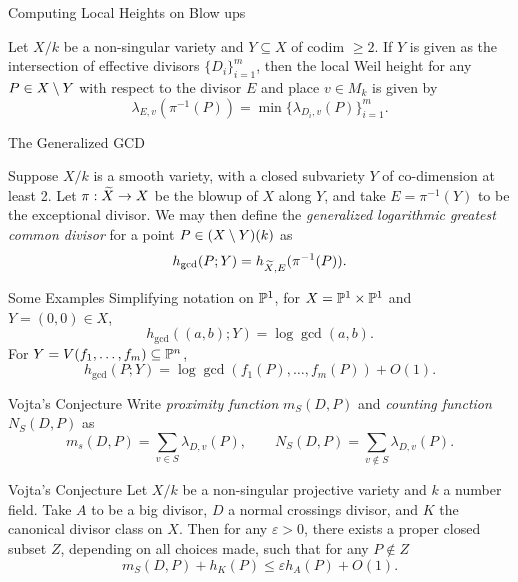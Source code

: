 \documentclass{beamer}
\begin{document}
\begin{frame}{Computing Local Heights on Blow ups}
    \begin{lemma}
        Let $X/k$ be a non-singular variety and $Y \subseteq X$ of codim $\geq 2$.
        If $Y$ is given as the intersection of effective divisors $\{D_i\}_{i = 1}^m$,
        then the local Weil height for any $P \in X \setminus Y$ with respect to the divisor $E$ and place $v \in M_k$ is given by
        \[
            \lambda_{E, v}(\pi^{-1}(P)) = \min\{\lambda_{D_i, v}(P)\}_{i = 1}^m.
        \]
    \end{lemma}
\end{frame}

\begin{frame}{The Generalized GCD}
    \begin{definition}
        Suppose $X/k$ is a smooth variety, with a closed subvariety $Y$ of co-dimension at least 2.
        Let $\pi : \widetilde X \to X$ be the blowup of $X$ along $Y$, 
        and take $E = \pi^{-1}(Y)$ to be the exceptional divisor.
        We may then define the \textit{generalized logarithmic greatest common divisor} for a point $P \in (X \setminus Y)(k)$ as
        \[
            h_{\gcd}(P; Y) = h_{\widetilde X, E}(\pi^{-1}(P)).
        \]
    \end{definition}
\end{frame}

\begin{frame}{Some Examples}
    Simplifying notation on $\mathbb{P}^1$, 
    for $X = \mathbb{P}^1 \times \mathbb{P}^1$ and $Y = (0, 0) \in X$,
    \[
        h_{\gcd}((a, b); Y) = \log \gcd (a, b).
    \]
    For $Y = V(f_1, \ldots, f_m) \subseteq \mathbb{P}^n$,
    \[
        h_{\gcd}(P; Y) = \log \gcd( f_1(P), \ldots, f_m(P)) + O(1).
    \]
\end{frame}

\begin{frame}{Vojta's Conjecture}
    Write \textit{proximity function} $m_S(D, P)$ and \textit{counting function} $N_S(D, P)$ as
    \[
        m_s(D, P)
        = \sum_{v \in S} \lambda_{D, v}(P), 
        \qquad
        N_S(D, P) = \sum_{v \notin S} \lambda_{D, v}(P).
    \]

    \begin{alertblock}{Vojta's Conjecture}
        Let $X/k$ be a non-singular projective variety and $k$ a number field.
        Take $A$ to be a big divisor, 
        $D$ a normal crossings divisor,
        and $K$ the canonical divisor class on $X$.
        Then for any $\varepsilon > 0$,
        there exists a proper closed subset $Z$,
        depending on all choices made,
        such that for any $P \notin Z$
        \[
            m_S(D, P) + h_{K}(P) \leq \varepsilon h_A(P) + O(1).
        \]
    \end{alertblock}
\end{frame}
\end{document}
